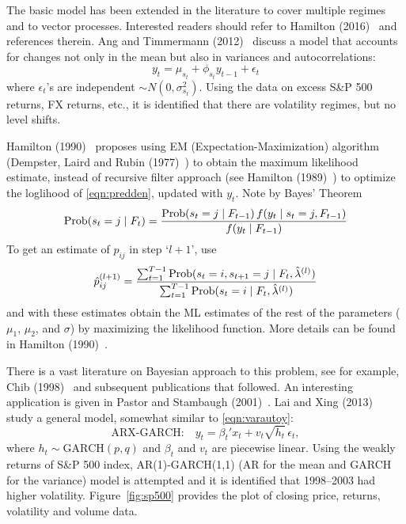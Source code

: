The basic model has been extended in the literature to cover multiple regimes and to vector processes. Interested readers should refer to Hamilton (2016)~\cite{jdham} and references therein. Ang and Timmermann (2012)~\cite{timmerman} discuss a model that accounts for changes not only in the mean but also in variances and autocorrelations:
	\begin{equation} \label{eqn:varautoy}
	y_t= \mu_{s_t} + \phi_{s_t} y_{t-1} + \epsilon_t
	\end{equation}
where $\epsilon_t$'s are independent $\sim N(0,\sigma_{s_t}^2)$. Using the data on excess S\&P 500 returns, FX returns, etc., it is identified that there are volatility regimes, but no level shifts.


Hamilton (1990)~\cite{90ham} proposes using EM (Expectation-Maximization) algorithm (Dempster, Laird and Rubin (1977)~\cite{dempster}) to obtain the maximum likelihood estimate, instead of recursive filter approach (see Hamilton (1989)~\cite{89ham}) to optimize the loglihood of \eqref{eqn:predden}, updated with $y_t$. Note by Bayes' Theorem
	\begin{equation} \label{eqn:bayes}
	\prob(s_t= j \;|\; F_t) = \dfrac{\prob(s_t= j \;|\; F_{t-1}) \, f(y_t\;|\; s_t=j, F_{t-1})}{f(y_t \;|\; F_{t-1})}
	\end{equation}
To get an estimate of $p_{ij}$ in step `$l+1$', use 
	\begin{equation}\label{eqn:hatpijl}
	\hat{p}_{ij}^{(l+1)}= \dfrac{\sum_{t=1}^{T-1} \prob(s_t= i, s_{t+1}= j \;|\; F_t, \hat{\lambda}^{(l)})}{\sum_{t=1}^{T-1} \prob(s_t= i \;|\; F_t, \hat{\lambda}^{(l)})}
	\end{equation}
and with these estimates obtain the ML estimates of the rest of the parameters ($\mu_1$, $\mu_2$, and $\sigma$) by maximizing the likelihood function. More details can be found in Hamilton (1990)~\cite{90ham}.


There is a vast literature on Bayesian approach to this problem, see for example, Chib (1998)~\cite{chib} and subsequent publications that followed. An interesting application is given in Pastor and Stambaugh (2001)~\cite{pastor}. Lai and Xing (2013)~\cite{laixing} study a general model, somewhat similar to \eqref{eqn:varautoy}:
	\begin{equation} \label{eqn:arxgarch}
	\text{ARX-GARCH:} \quad y_t= \beta_t' x_t + v_t \sqrt{h_t} \, \epsilon_t,
	\end{equation}
where $h_t \sim \text{GARCH}(p,q)$ and $\beta_t$ and $v_t$ are piecewise linear. Using the weakly returns of S\&P 500 index, AR(1)-GARCH(1,1) (AR for the mean and GARCH for the variance) model is attempted and it is identified that 1998--2003 had higher volatility. Figure~\ref{fig:sp500} provides the plot of closing price, returns, volatility and volume data. 

